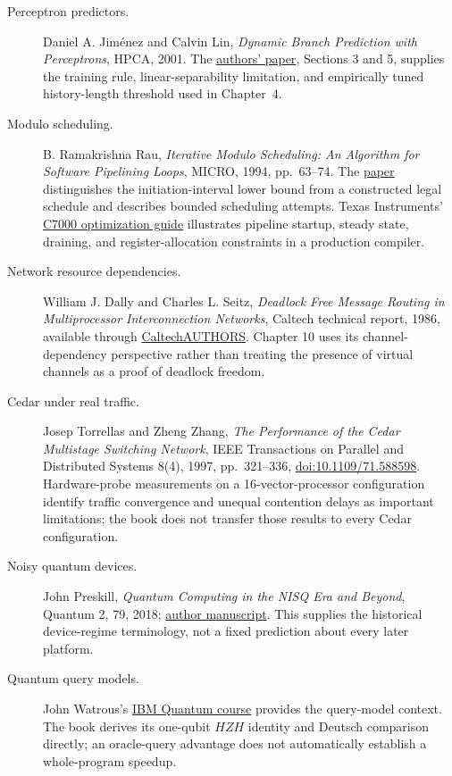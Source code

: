 \begin{description}
  \item[Perceptron predictors.] Daniel A. Jiménez and Calvin Lin, \emph{Dynamic Branch Prediction with Perceptrons}, HPCA, 2001. The \href{https://www.cs.utexas.edu/~lin/papers/hpca01.pdf}{authors' paper}, Sections 3 and 5, supplies the training rule, linear-separability limitation, and empirically tuned history-length threshold used in Chapter~4.
  \item[Modulo scheduling.] B. Ramakrishna Rau, \emph{Iterative Modulo Scheduling: An Algorithm for Software Pipelining Loops}, MICRO, 1994, pp.\ 63--74. The \href{https://doi.org/10.1145/192724.192731}{paper} distinguishes the initiation-interval lower bound from a constructed legal schedule and describes bounded scheduling attempts. Texas Instruments' \href{https://software-dl.ti.com/codegen/docs/c7000/optimization_guide/5_understand_opt/compopt_under_pipelining.html}{C7000 optimization guide} illustrates pipeline startup, steady state, draining, and register-allocation constraints in a production compiler.
  \item[Network resource dependencies.] William J. Dally and Charles L. Seitz, \emph{Deadlock Free Message Routing in Multiprocessor Interconnection Networks}, Caltech technical report, 1986, available through \href{https://authors.library.caltech.edu/records/vqrey-g1h07}{CaltechAUTHORS}. Chapter 10 uses its channel-dependency perspective rather than treating the presence of virtual channels as a proof of deadlock freedom.
  \item[Cedar under real traffic.] Josep Torrellas and Zheng Zhang, \emph{The Performance of the Cedar Multistage Switching Network}, IEEE Transactions on Parallel and Distributed Systems 8(4), 1997, pp.\ 321--336, \href{https://doi.org/10.1109/71.588598}{doi:10.1109/71.588598}. Hardware-probe measurements on a 16-vector-processor configuration identify traffic convergence and unequal contention delays as important limitations; the book does not transfer those results to every Cedar configuration.
  \item[Noisy quantum devices.] John Preskill, \emph{Quantum Computing in the NISQ Era and Beyond}, Quantum 2, 79, 2018; \href{https://arxiv.org/abs/1801.00862}{author manuscript}. This supplies the historical device-regime terminology, not a fixed prediction about every later platform.
  \item[Quantum query models.] John Watrous's \href{https://quantum.cloud.ibm.com/learning/en/courses/fundamentals-of-quantum-algorithms/quantum-query-algorithms/introduction}{IBM Quantum course} provides the query-model context. The book derives its one-qubit $HZH$ identity and Deutsch comparison directly; an oracle-query advantage does not automatically establish a whole-program speedup.

\end{description}
